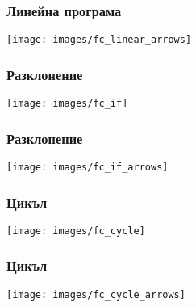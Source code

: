 \documentclass{beamer}
\begin{document}
\begin{frame}[fragile]
\frametitle{Линейна програма}

\hspace*{-30pt}
\texttt{[image: images/fc\_linear\_arrows]} 

\end{frame}


\begin{frame}[fragile]
\frametitle{Разклонение}

\hspace*{-30pt}
\texttt{[image: images/fc\_if]} 

\end{frame}


\begin{frame}[fragile]
\frametitle{Разклонение}

\hspace*{-30pt}
\texttt{[image: images/fc\_if\_arrows]} 

\end{frame}

\begin{frame}[fragile]
\frametitle{Цикъл}

\hspace*{-30pt}
\texttt{[image: images/fc\_cycle]} 

\end{frame}


\begin{frame}[fragile]
\frametitle{Цикъл}

\hspace*{-30pt}
\texttt{[image: images/fc\_cycle\_arrows]} 

\end{frame}
\end{document}
